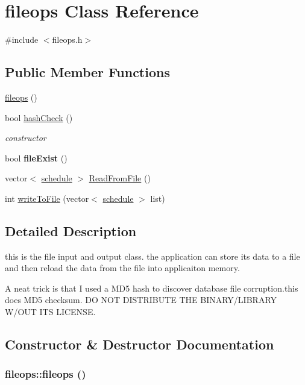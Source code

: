 \hypertarget{classfileops}{
\section{fileops Class Reference}
\label{classfileops}
}


{\ttfamily \#include $<$fileops.h$>$}\subsection*{Public Member Functions}
\begin{DoxyCompactItemize}
\item 
\hyperlink{classfileops_a4a5ae75f8b1529001d710bce3e2f1c30}{fileops} ()
\item 
bool \hyperlink{classfileops_a978fbcad1782aae513c2690bd43985c3}{hashCheck} ()
\begin{DoxyCompactList}\small\item\em constructor \item\end{DoxyCompactList}\item 
\hypertarget{classfileops_ac05aff8afc2232d4407428a17177760d}{
bool {\bfseries fileExist} ()}
\label{classfileops_ac05aff8afc2232d4407428a17177760d}

\item 
vector$<$ \hyperlink{classschedule}{schedule} $>$ \hyperlink{classfileops_ae29d933450817ab66cd743382ce65226}{ReadFromFile} ()
\item 
int \hyperlink{classfileops_a19786cd653a381ba6b185cfbab4efb0a}{writeToFile} (vector$<$ \hyperlink{classschedule}{schedule} $>$ list)
\end{DoxyCompactItemize}


\subsection{Detailed Description}
this is the file input and output class. the application can store its data to a file and then reload the data from the file into applicaiton memory.

A neat trick is that I used a MD5 hash to discover database file corruption.this does MD5 checksum. DO NOT DISTRIBUTE THE BINARY/LIBRARY W/OUT ITS LICENSE. 

\subsection{Constructor \& Destructor Documentation}
\hypertarget{classfileops_a4a5ae75f8b1529001d710bce3e2f1c30}{
\subsubsection[{fileops}]{\setlength{\rightskip}{0pt plus 5cm}fileops::fileops ()}}
\label{classfileops_a4a5ae75f8b1529001d710bce3e2f1c30}



